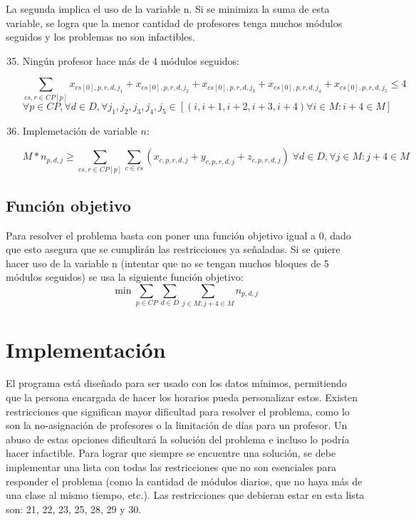 \documentclass[letterpaper]{article}
\begin{document}
La segunda implica el uso de la variable n. Si se minimiza la suma de esta variable, se logra que la menor cantidad de profesores tenga muchos módulos seguidos y los problemas no son infactibles.

\begin{enumerate}
    \setcounter{enumi}{34}
    \item Ningún profesor hace más de 4 módulos seguidos:
    
    $$\sum_{cs,r \in CP[p]} x_{cs[0],p,r,d,j_1} + x_{cs[0],p,r,d,j_2} + x_{cs[0],p,r,d,j_3} + x_{cs[0],p,r,d,j_4} + x_{cs[0],p,r,d,j_5} \leq 4$$
    $$\forall p \in CP, \forall d \in D, \forall j_1,j_2,j_3,j_4,j_5 \in [(i,i+1,i+2,i+3,i+4) \forall i \in M : i+4 \in M]$$

    \item Implemetación de variable $n$:

    $$M * n_{p,d,j} \geq \sum_{cs,r \in CP[p]} \sum_{c \in cs}(x_{c,p,r,d,j} + y_{c,p,r,d,j} + z_{c,p,r,d,j}) \; \forall d \in D, \forall j \in M : j+4 \in M$$
\end{enumerate}

\subsection{Función objetivo}

Para resolver el problema basta con poner una función objetivo igual a 0, dado que esto asegura que se cumplirán las restricciones ya señaladas. Si se quiere hacer uso de la variable n (intentar que no se tengan muchos bloques de 5 módulos seguidos) se usa la siguiente función objetivo:
$$\min \sum_{p \in CP} \sum_{d \in D} \sum_{j \in M : j+4 \in M} n_{p,d,j}$$

\section{Implementación}

El programa está diseñado para ser usado con los datos mínimos, permitiendo que la persona encargada de hacer los horarios pueda personalizar estos. Existen restricciones que significan mayor dificultad para resolver el problema, como lo son la no-asignación de profesores o la limitación de días para un profesor. Un abuso de estas opciones dificultará la solución del problema e incluso lo podría hacer infactible. Para lograr que siempre se encuentre una solución, se debe implementar una lista con todas las restricciones que no son esenciales para responder el problema (como la cantidad de módulos diarios, que no haya más de una clase al mismo tiempo, etc.). Las restricciones que debieran estar en esta lista son: 21, 22, 23, 25, 28, 29 y 30. 
\end{document}
